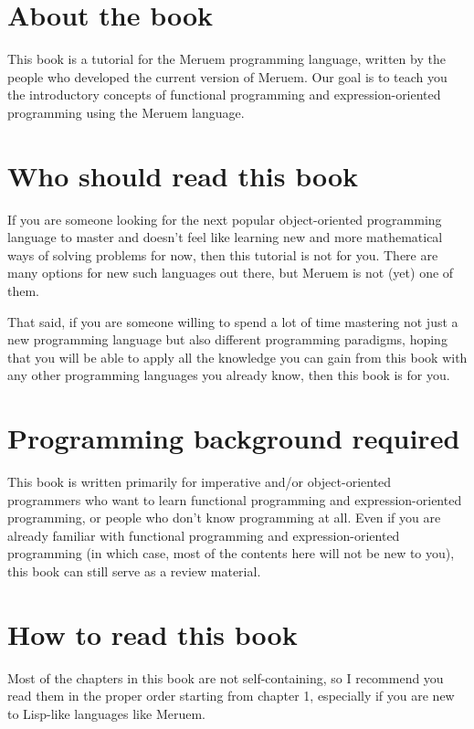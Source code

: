 \section{About the book}
This book is a tutorial for the Meruem programming language, written by the people who developed the current version of Meruem. Our goal is to teach you the introductory concepts of functional programming and expression-oriented programming using the Meruem language. 

\section{Who should read this book}
If you are someone looking for the next popular object-oriented programming language to master and doesn't feel like learning new and more mathematical ways of solving problems for now, then this tutorial is not for you. There are many options for new such languages out there, but Meruem is not (yet) one of them.

That said, if you are someone willing to spend a lot of time mastering not just a new programming language but also different programming paradigms, hoping that you will be able to apply all the knowledge you can gain from this book with any other programming languages you already know, then this book is for you.

\section{Programming background required}
This book is written primarily for imperative and/or object-oriented programmers who want to learn functional programming and expression-oriented programming, or people who don't know programming at all. Even if you are already familiar with functional programming and expression-oriented programming (in which case, most of the contents here will not be new to you), this book can still serve as a review material.

\section{How to read this book}
Most of the chapters in this book are not self-containing, so I recommend you read them in the proper order starting from chapter 1, especially if you are new to Lisp-like languages like Meruem. 